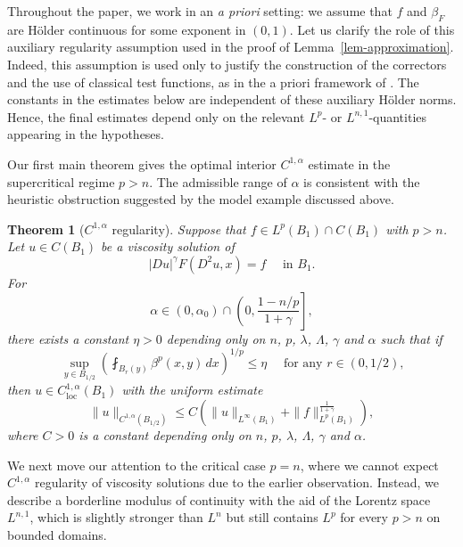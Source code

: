 \documentclass[11pt]{amsart}
\theoremstyle{plain}
\newtheorem{theorem}{Theorem}[section]
\theoremstyle{definition}
\numberwithin{equation}{section}
\begin{document}
Throughout the paper, we work in an \textit{a priori} setting: we assume that $f$ and $\beta_F$ are H\"older continuous for some exponent in $(0,1)$. Let us clarify the role of this auxiliary regularity assumption used in the proof of Lemma~\ref{lem-approximation}. Indeed, this assumption is used only to justify the construction of the correctors and the use of classical test functions, as in the a priori framework of \cite[Section~8.2]{CC95}. The constants in the estimates below are independent of these auxiliary H\"older norms. Hence, the final estimates depend only on the relevant $L^p$- or $L^{n,1}$-quantities appearing in the hypotheses.\newline


Our first main theorem gives the optimal interior $C^{1,\alpha}$ estimate in the supercritical regime $p>n$. The admissible range of $\alpha$ is consistent with the heuristic obstruction suggested by the model example discussed above.

\begin{theorem}[$C^{1, \alpha}$ regularity]\label{thm-main-p>n}
    Suppose that $f \in L^p(B_1)\cap C(B_1)$ with $p>n$. Let $u \in C(B_1)$ be a viscosity solution of 
    \begin{equation*}
        |Du|^\gamma F(D^2u,x) =f \quad \text{ in }B_1.
    \end{equation*}
    For 
    \begin{equation*}
        \alpha \in(0,\alpha_0)\cap \left(0,\frac{1-n/p}{1+\gamma} \right],
    \end{equation*}
    there exists a constant $\eta>0$ depending only on $n$, $p$, $\lambda$, $\Lambda$, $\gamma$ and $\alpha$ such that if 
    \begin{equation*}
         \sup_{y \in B_{1/2}} \left(\fint_{B_r(y)} \beta^p(x, y) \, dx \right)^{1/p}  \leq \eta \quad \text{ for any $r \in (0, 1/2)$,}
    \end{equation*}
     then $u \in C_{\mathrm{loc}}^{1, \alpha}(B_1)$ with the uniform estimate
    \begin{equation*}
        \|u\|_{C^{1,\alpha}(B_{1/2})} \leq C(\|u\|_{L^\infty(B_1)}+\|f\|_{L^p(B_1)}^{\frac{1}{1+\gamma}}),
    \end{equation*}
    where $C>0$ is a constant depending only on $n$, $p$, $\lambda$, $\Lambda$, $\gamma$ and $\alpha$.
\end{theorem}

We next move our attention to the critical case $p=n$, where we cannot expect $C^{1, \alpha}$ regularity of viscosity solutions due to the earlier observation. Instead, we describe a borderline modulus of continuity with the aid of the Lorentz space $L^{n, 1}$, which is slightly stronger than $L^n$ but still contains $L^p$ for every $p>n$ on bounded domains.
\end{document}
